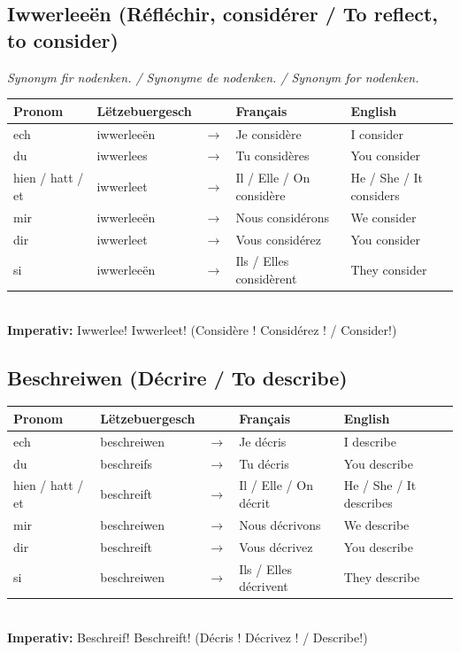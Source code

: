 \subsection*{Iwwerleeën (Réfléchir, considérer / To reflect, to consider)}
\textit{Synonym fir nodenken. / Synonyme de nodenken. / Synonym for nodenken.}
\\[0.5em]
\begin{tabular}{ll c l l}
    \toprule
    \textbf{Pronom} & \textbf{Lëtzebuergesch} & \textbf{} & \textbf{Français} & \textbf{English} \\
    \midrule
    ech & iwwerleeën & $\rightarrow$ & Je considère & I consider \\
    du & iwwerlees & $\rightarrow$ & Tu considères & You consider \\
    hien / hatt / et & iwwerleet & $\rightarrow$ & Il / Elle / On considère & He / She / It considers \\
    \midrule
    mir & iwwerleeën & $\rightarrow$ & Nous considérons & We consider \\
    dir & iwwerleet & $\rightarrow$ & Vous considérez & You consider \\
    si & iwwerleeën & $\rightarrow$ & Ils / Elles considèrent & They consider \\
    \bottomrule
\end{tabular}
\\[1em]
\textbf{Imperativ:} Iwwerlee! Iwwerleet! (Considère ! Considérez ! / Consider!)

\subsection*{Beschreiwen (Décrire / To describe)}
\begin{tabular}{ll c l l}
    \toprule
    \textbf{Pronom} & \textbf{Lëtzebuergesch} & \textbf{} & \textbf{Français} & \textbf{English} \\
    \midrule
    ech & beschreiwen & $\rightarrow$ & Je décris & I describe \\
    du & beschreifs & $\rightarrow$ & Tu décris & You describe \\
    hien / hatt / et & beschreift & $\rightarrow$ & Il / Elle / On décrit & He / She / It describes \\
    \midrule
    mir & beschreiwen & $\rightarrow$ & Nous décrivons & We describe \\
    dir & beschreift & $\rightarrow$ & Vous décrivez & You describe \\
    si & beschreiwen & $\rightarrow$ & Ils / Elles décrivent & They describe \\
    \bottomrule
\end{tabular}
\\[1em]
\textbf{Imperativ:} Beschreif! Beschreift! (Décris ! Décrivez ! / Describe!)

